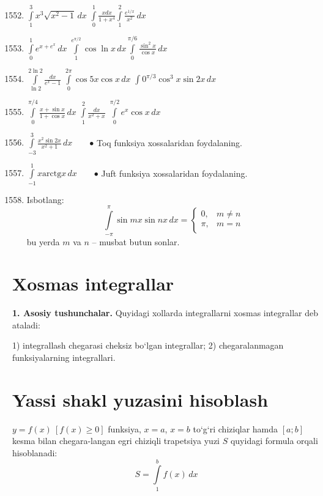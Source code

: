 	\begin{enumerate}
		\setcounter{enumi}{1551}
	\item $\int\limits_{1}^{3}x^{3}\sqrt{x^{2}-1}\,dx$ \inlineitem $\int\limits_{0}^{1}\frac{xdx}{1+x^{4}}$\inlineitem $\int\limits_{1}^{2}\frac{e^{1/x}}{x^{2}}\,dx$
	\item $\int\limits_{0}^{1}e^{x+e^{x}}\,dx$ \inlineitem $\int\limits_{1}^{e^{\pi/2}}\cos\ln{x}\,dx$\inlineitem$\int\limits_{0}^{\pi/6}\frac{\sin^{2}x}{\cos{x}}\,dx$
	\item $\int\limits_{\ln{2}}^{2\ln{2}}\frac{dx}{e^{x}-1}$
	\inlineitem $\int\limits_{0}^{2\pi}\cos{5x}\cos{x}\,dx$
	\inlineitem $\int\limits{0}^{\pi/3}\cos^{3}{x}\sin{2x}\,dx$
	\item $\int\limits_{0}^{\pi/4}\frac{x+\sin{x}}{1+\cos{x}}\,dx$
	\inlineitem $\int\limits_{1}^{2}\frac{dx}{x^{2}+x}$
	\inlineitem $\int\limits_{0}^{\pi/2}e^{x}\cos{x}\,dx$
	\item $\int\limits_{-3}^{3}\frac{x^{2}\sin{2x}}{x^{2}+1}\,dx$\ \ \ \ 	
	$\bullet$ Toq funksiya xossalaridan foydalaning.
	\item $\int\limits_{-1}^{1}x\textrm{arctg}x\,dx$\ \ \ \ 	
	$\bullet$ Juft funksiya xossalaridan foydalaning.
	
	\item Isbotlang:
	$$\int\limits_{-\pi}^{\pi}\sin{mx}\sin{nx}\,dx=\begin{cases}
		0,& m\ne n\\
		\pi, & m=n\\
	\end{cases}$$
bu yerda $m$ va $n$ -- musbat butun sonlar.
\end{enumerate}


\section{Xosmas integrallar}

\textbf{1. Asosiy tushunchalar. }Quyidagi xollarda integrallarni xosmas integrallar deb ataladi:


1) integrallash chegarasi cheksiz bo`lgan integrallar; 
2) chegaralanmagan funksiyalarning integrallari.









\section{Yassi shakl yuzasini hisoblash}
\hspace{0.6cm}
$y=f(x)\ [f(x)\ge0]$ funksiya, $x=a$, $x=b$ to`g`ri chiziqlar hamda $[a;b]$ kesma bilan chegara-langan egri chiziqli trapetsiya yuzi $S$ quyidagi formula orqali hisoblanadi:
$$S=\int\limits_1^b f(x)\,dx$$

